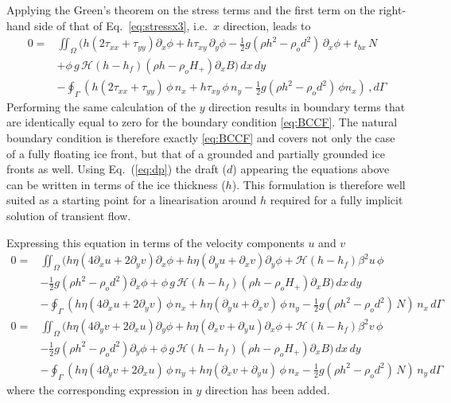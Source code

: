 \documentclass[10pt,a4paper]{book}
\newcommand{\He}{\mathcal{H}}
\newcommand{\p}{\partial}
\newcommand{\tbx}{t_{bx}}
\newcommand{\txx}{\tau_{xx}}
\newcommand{\tyy}{\tau_{yy}}
\newcommand{\txy}{\tau_{xy}}
\begin{document}
Applying the Green's theorem on the stress terms and the first term on the right-hand side of that of
Eq.~\eqref{eq:stressx3}, i.e.\ $x$ direction, leads to
\begin{align*} 
0=&\iint_{\Omega} \Big ( h ( 2 \txx + \tyy) \p_x\phi +  h \txy \, \p_y\phi - \frac{1}{2} g (\rho h^2 - \rho_o d^2) \, \p_x\phi 
+ \tbx \, N
\\ & +\phi \, g\,\He(h-h_f) (\rho h -\rho_o H_{+}) \p_x B \Big ) \, dx \, dy
\\ & - \oint_{\Gamma} (h ( 2 \txx + \tyy) \,\phi \, n_x+  h \txy \,\phi \, n_y- \frac{1}{2} g (\rho h^2 - \rho_o d^2) \,\phi n_x)\, , d\Gamma 
\end{align*}
Performing the same calculation of the $y$ direction results in
boundary terms that are identically equal to zero for the boundary
condition \eqref{eq:BCCF}. The natural boundary condition is therefore
exactly \eqref{eq:BCCF} and covers not only the case of a fully
floating ice front, but that of a grounded and partially grounded ice
fronts as well.  Using Eq.~(\ref{eq:dp}) the draft ($d$) appearing the
equations above can be written in terms of the ice thickness
($h$). This formulation is therefore well suited as a starting point
for a linearisation around $h$ required for a fully implicit solution
of transient flow.


Expressing this equation in terms of the velocity components $u$ and $v$
\begin{align} 
0=&\iint_{\Omega} (h \eta ( 4 \p_x u + 2 \p_y v ) \p_x\phi +  h \eta (\p_y u + \p_x v) \p_y\phi + \He(h-h_f) \beta^2 u \,\phi \nonumber \\
  &- \frac{1}{2} g (\rho h^2 - \rho_o d^2) \p_x\phi   +\phi \, g\,\He(h-h_f) (\rho h -\rho_o H_{+}) \p_x B ) \, dx \, dy \nonumber \\
  & - \oint_{\Gamma} (h \eta ( 4\p_x u + 2 \p_y v) \,\phi \, n_x+  h \eta (\p_y u + \p_x v) \,\phi \, n_y- \frac{1}{2} g (\rho h^2 - \rho_o d^2) \, N)\, n_x\, d\Gamma \label{eq:FEx2}\\
0=&\iint_{\Omega} (h \eta ( 4 \p_y v + 2 \p_x u ) \p_y\phi +  h \eta (\p_x v + \p_y u) \p_x\phi + \He(h-h_f) \beta^2 v \,\phi \nonumber
\\ &- \frac{1}{2} g (\rho h^2 - \rho_o d^2) \p_y\phi   +\phi \, g\,\He(h-h_f) (\rho h -\rho_o H_{+}) \p_x B ) \, dx \, dy \nonumber \\
  & - \oint_{\Gamma} (h \eta ( 4\p_y v + 2 \p_x u) \,\phi \, n_y+  h \eta (\p_x v + \p_y u) \,\phi \, n_x- \frac{1}{2} g (\rho h^2 - \rho_o d^2) \, N)\, n_y\, d\Gamma \label{eq:FEy2}
\end{align}
where the corresponding expression in $y$ direction has been added.
\end{document}

